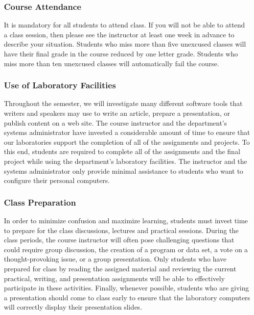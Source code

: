 \vspace*{-.1in}
\subsubsection*{Course Attendance}

It is mandatory for all students to attend class. If you will not be able to attend a class session, then please see
the instructor at least one week in advance to describe your situation. Students who miss more than five unexcused
classes will have their final grade in the course reduced by one letter grade. Students who miss more than ten
unexcused classes will automatically fail the course.

\vspace*{-.1in}
\subsubsection*{Use of Laboratory Facilities}

Throughout the semester, we will investigate many different software tools that writers and speakers may use to write an
article, prepare a presentation, or publish content on a web site. The course instructor and the department's systems
administrator have invested a considerable amount of time to ensure that our laboratories support the completion of all
of the assignments and projects. To this end, students are required to complete all of the assignments and the final
project while using the department's laboratory facilities. The instructor and the systems administrator only provide
minimal assistance to students who want to configure their personal computers.

\vspace*{-.1in}
\subsubsection*{Class Preparation}

In order to minimize confusion and maximize learning, students must invest time to prepare for the class discussions,
lectures and practical sessions. During the class periods, the course instructor will often pose challenging questions
that could require group discussion, the creation of a program or data set, a vote on a thought-provoking issue, or a
group presentation. Only students who have prepared for class by reading the assigned material and reviewing the current
practical, writing, and presentation assignments will be able to effectively participate in these activities. Finally,
whenever possible, students who are giving a presentation should come to class early to ensure that the laboratory
computers will correctly display their presentation slides.

